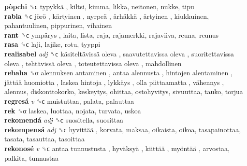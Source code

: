 \textbf{pòpchi} ␝ϲ   typykkä , kiltsi, kimma, likka, neitonen, nukke, tipu  \\
\textbf{rabia} ␝ϲ   jörö ,  kärtyinen ,  nyrpeä ,  ärhäkkä ,  ärtyinen , kiukkuinen, pahantuulinen, pippurinen, vihainen  \\
\textbf{rant} ␝ϲ   ympärys , laita, lista, raja, rajamerkki, rajaviiva, reuna, reunus  \\
\textbf{rasa} ␝ϲ  laji, lajike, rotu, tyyppi  \\
\textbf{realisabel} \emph{adj}  ␝ϲ   käsiteltävissä oleva ,  saavutettavissa oleva ,  suoritettavissa oleva ,  tehtävissä oleva ,  toteutettavissa oleva , mahdollinen  \\
\textbf{rebaha} ␝α   alennuksen antaminen ,  antaa alennusta ,  hintojen alentaminen ,  jättää huomiotta ,  laskea hintoja ,  lykkäys ,  olla piittaamatta ,  vähennys , alennus, diskonttokorko, keskeytys, ohittaa, ostohyvitys, sivuuttaa, tauko, torjua  \\
\textbf{regresá} \emph{v}  ␝ϲ  muistuttaa, palata, palauttaa  \\
\textbf{rek} ␝α  laskea, luottaa, nojata, turvata, uskoa  \\
\textbf{rekomendá} \emph{adj}  ␝ϲ  suositella, suosittaa  \\
\textbf{rekompensá} \emph{adj}  ␝ϲ   hyvittää , korvata, maksaa, oikaista, oikoa, tasapainottaa, tasata, tasauttaa, tasoittaa  \\
\textbf{rekonosé} \emph{v}  ␝ϲ   antaa tunnustusta ,  hyväksyä ,  kiittää ,  myöntää , arvostaa, palkita, tunnustaa  \\
